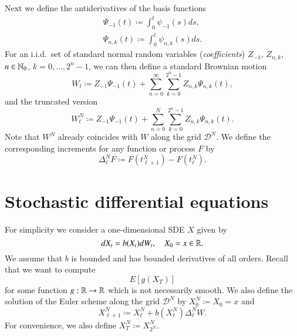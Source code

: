 \documentclass{amsart}
\begin{document}
Next we define the antiderivatives of the basis functions
\begin{subequations}
  \label{eq:Haar-int-basis}
  \begin{gather}
    \label{eq:Haar-int-constant}
    \Psi_{-1}(t) \coloneqq \int_0^t \psi_{-1}(s) ds, \\
    \label{eq:Haar-int-nonconstant}
    \Psi_{n,k}(t) \coloneqq \int_0^t \psi_{n,k}(s) ds.
  \end{gather}
\end{subequations}
For an i.i.d.~set of standard normal random variables (\emph{coefficients})
$Z_{-1}$, $Z_{n,k}$, $n \in \mathbb{N}_0$, $k = 0, \ldots, 2^n-1$, we can then define
a standard Brownian motion
\begin{equation}
  \label{eq:Brownian-motion}
  W_t \coloneqq Z_{-1} \Psi_{-1}(t) + \sum_{n=0}^\infty \sum_{k=0}^{2^n-1}
  Z_{n,k} \Psi_{n,k}(t),
\end{equation}
and the truncated version
\begin{equation}
  \label{eq:Brownian-motion-truncated}
  W_t^N \coloneqq Z_{-1} \Psi_{-1}(t) + \sum_{n=0}^N \sum_{k=0}^{2^n-1}
  Z_{n,k} \Psi_{n,k}(t).
\end{equation}
Note that $W^N$ already coincides with $W$ along the grid $\mathcal{D}^N$. We
define the corresponding increments for any function or process $F$ by
\begin{equation}
  \label{eq:increments}
  \Delta^N_\ell F \coloneqq F(t^N_{\ell+1}) - F(t^N_\ell).
\end{equation}

\section{Stochastic differential equations}
\label{sec:stoch-diff-equat}

For simplicity we consider a one-dimensional SDE $X$ given by
\begin{equation}
  \label{eq:SDE}
  dX_t = b(X_t) dW_t, \quad X_0 = x \in \mathbb{R}.
\end{equation}
We assume that $b$ is bounded and has bounded derivatives of all
orders. Recall that we want to compute
\begin{equation*}
  E\left[ g\left( X_T \right) \right]
\end{equation*}
for some function $g : \mathbb{R} \to \mathbb{R}$ which is not necessarily smooth.
We also define the solution of the Euler scheme along the grid $\mathcal{D}^N$
by $X^N_0 \coloneqq X_0 = x$ and
\begin{equation}
  \label{eq:euler}
  X^N_{\ell+1} \coloneqq X^N_\ell + b\left( X^N_{\ell} \right) \Delta^N_\ell W.
\end{equation}
For convenience, we also define $X^N_T \coloneqq X^N_{2^N}$.
\end{document}
